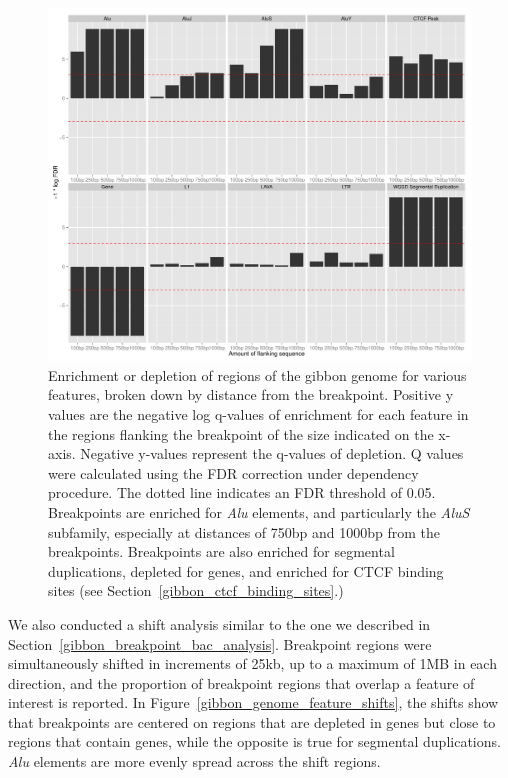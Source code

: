 \begin{figure}
\centering
\includegraphics[width=1\textwidth]{figures/regionHitQuantiles.pdf}
\caption{Enrichment or depletion of regions of the gibbon genome for various features, broken down by distance from the breakpoint. Positive y values are the negative log q-values of enrichment for each feature in the regions flanking the breakpoint of the size indicated on the x-axis. Negative y-values represent the q-values of depletion. Q values were calculated using the FDR correction under dependency procedure. The dotted line indicates an FDR threshold of 0.05. Breakpoints are enriched for \emph{Alu} elements, and particularly the \emph{AluS} subfamily, especially at distances of 750bp and 1000bp from the breakpoints. Breakpoints are also enriched for segmental duplications, depleted for genes, and enriched for CTCF binding sites (see Section~\ref{gibbon_ctcf_binding_sites}.)}
\label{gibbon_genome_enrich_by_distance}
\end{figure}

We also conducted a shift analysis similar to the one we described in Section~\ref{gibbon_breakpoint_bac_analysis}. Breakpoint regions were simultaneously shifted in increments of 25kb, up to a maximum of 1MB in each direction, and the proportion of breakpoint regions that overlap a feature of interest is reported. In Figure~\ref{gibbon_genome_feature_shifts}, the shifts show that breakpoints are centered on regions that are depleted in genes but close to regions that contain genes, while the opposite is true for segmental duplications. \emph{Alu} elements are more evenly spread across the shift regions.

